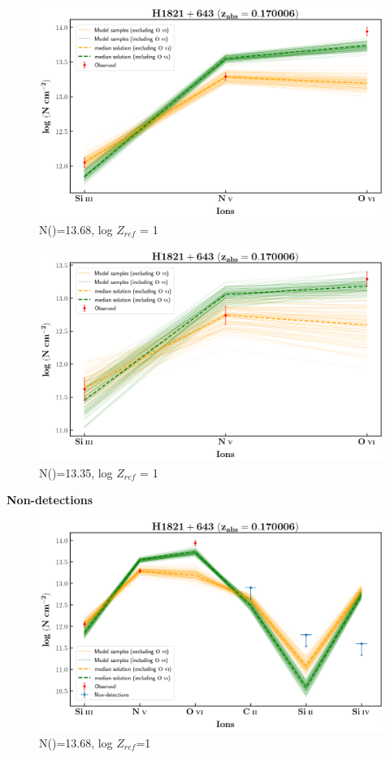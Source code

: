 \documentclass[12pt]{report}
\newcommand\ion[2]{\text{#1\,\textsc{\lowercase{#2}}}}
\begin{document}
\newpage

\begin{figure}[!h]
    \centering
    \includegraphics[width=0.85\linewidth]{Ionisation-Modelling-Plots/h1821-z=0.170006-compII.png}
    \caption{N(\ion{H}{i})=13.68, log $Z_{ref}$ = 1}
\end{figure}

\begin{figure}[!b]
    \centering
    \includegraphics[width=0.85\linewidth]{Ionisation-Modelling-Plots/h1821-z=0.170006-compIII.png}
    \caption{N(\ion{H}{i})=13.35, log $Z_{ref}$ = 1}
\end{figure}


\newpage

\textbf{Non-detections}

\begin{figure}[!h]
    \centering
    \includegraphics[width=0.85\linewidth]{Ionisation-Modelling-Plots/h1821-z=0.170006-compII_logZ=1_non_detection.png}
    \caption{N(\ion{H}{i})=13.68, log $Z_{ref}$=1}
\end{figure}
\end{document}

